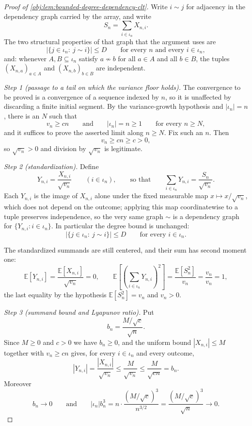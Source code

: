 \documentclass[11pt]{article}
\begin{document}
\begin{proof}[Proof of \cref{obj:lem:bounded-degree-dependency-clt}]
Write \(i\sim j\) for adjacency in the dependency graph carried by the array, and write
\[
S_n=\sum_{i\in\iota_n}X_{n,i}.
\]
The two structural properties of that graph that the argument uses are
\[
\left|\{j\in\iota_n:\ j\sim i\}\right|\le D
\qquad\text{for every }n\text{ and every }i\in\iota_n,
\]
and: whenever \(A,B\subseteq\iota_n\) satisfy \(a\not\sim b\) for all \(a\in A\) and all \(b\in B\), the tuples \((X_{n,a})_{a\in A}\) and \((X_{n,b})_{b\in B}\) are independent.

\textit{Step 1 (passage to a tail on which the variance floor holds).}
The convergence to be proved is a convergence of a sequence indexed by \(n\), so it is unaffected by discarding a finite initial segment. By the variance-growth hypothesis and \(|\iota_n|=n\), there is an \(N\) such that
\[
v_n\ge cn
\qquad\text{and}\qquad
|\iota_n|=n\ge 1
\qquad\text{for every }n\ge N,
\]
and it suffices to prove the asserted limit along \(n\ge N\). Fix such an \(n\). Then
\[
v_n\ge cn\ge c>0,
\]
so \(\sqrt{v_n}>0\) and division by \(\sqrt{v_n}\) is legitimate.

\textit{Step 2 (standardization).} Define
\[
Y_{n,i}=\frac{X_{n,i}}{\sqrt{v_n}}
\qquad(i\in\iota_n),
\qquad\text{so that}\qquad
\sum_{i\in\iota_n}Y_{n,i}=\frac{S_n}{\sqrt{v_n}}.
\]
Each \(Y_{n,i}\) is the image of \(X_{n,i}\) alone under the fixed measurable map \(x\mapsto x/\sqrt{v_n}\), which does not depend on the outcome; applying this map coordinatewise to a tuple preserves independence, so the very same graph \(\sim\) is a dependency graph for \(\{Y_{n,i}:i\in\iota_n\}\). In particular the degree bound is unchanged:
\[
\left|\{j\in\iota_n:\ j\sim i\}\right|\le D
\qquad\text{for every }i\in\iota_n.
\]

The standardized summands are still centered, and their sum has second moment one:
\[
\mathbb E\!\left[Y_{n,i}\right]
=\frac{\mathbb E\!\left[X_{n,i}\right]}{\sqrt{v_n}}=0,
\qquad
\mathbb E\!\left[\left(\sum_{i\in\iota_n}Y_{n,i}\right)^{2}\right]
=\frac{\mathbb E\!\left[S_n^{2}\right]}{v_n}
=\frac{v_n}{v_n}
=1,
\]
the last equality by the hypothesis \(\mathbb E[S_n^2]=v_n\) and \(v_n>0\).

\textit{Step 3 (summand bound and Lyapunov ratio).} Put
\[
b_n=\frac{M/\sqrt c}{\sqrt n}.
\]
Since \(M\ge0\) and \(c>0\) we have \(b_n\ge0\), and the uniform bound \(|X_{n,i}|\le M\) together with \(v_n\ge cn\) gives, for every \(i\in\iota_n\) and every outcome,
\[
\left|Y_{n,i}\right|
=\frac{\left|X_{n,i}\right|}{\sqrt{v_n}}
\le\frac{M}{\sqrt{v_n}}
\le\frac{M}{\sqrt{cn}}
=b_n .
\]
Moreover
\[
b_n\longrightarrow 0
\qquad\text{and}\qquad
\left|\iota_n\right|b_n^{3}
=n\cdot\frac{(M/\sqrt c)^{3}}{n^{3/2}}
=\frac{(M/\sqrt c)^{3}}{\sqrt n}
\longrightarrow0 .
\]


\end{proof}
\end{document}
